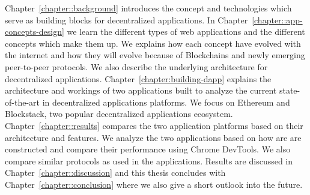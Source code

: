 Chapter~\ref{chapter::background} introduces the concept and technologies which serve as building blocks for decentralized applications. In Chapter~\ref{chapter::app-concepts-design} we learn the different types of web applications and the different concepts which make them up. We explains how each concept have evolved with the internet and how they will evolve because of Blockchains and newly emerging peer-to-peer protocols. We also describe the underlying architecture for decentralized applications. Chapter~\ref{chapter:building-dapp} explains the architecture and workings of two applications built to analyze the current state-of-the-art in decentralized applications platforms. We focus on Ethereum and Blockstack, two popular decentralized applications ecosystem. Chapter~\ref{chapter::results} compares the two application platforms based on their architecture and features. We analyze the two applications based on how are are constructed and compare their performance using Chrome DevTools. We also compare similar protocols as used in the applications. Results are discussed in Chapter~\ref{chapter::discussion} and this thesis concludes with Chapter~\ref{chapter::conclusion} where we also give a short outlook into the future.
